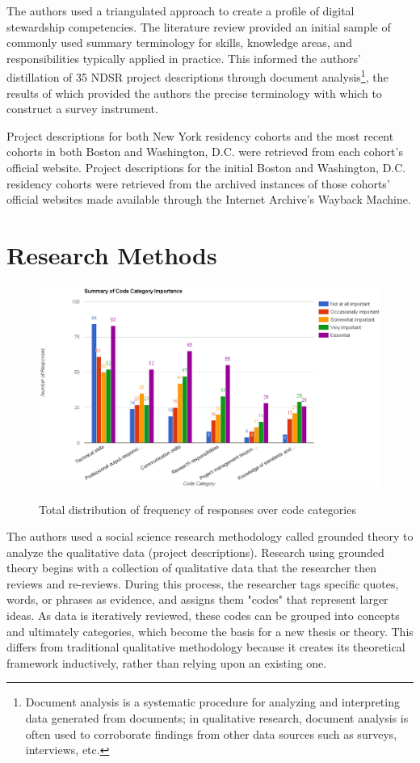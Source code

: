 \documentclass{acm_proc_article-sp}
\begin{document}
The authors used a triangulated approach to create a profile of digital stewardship competencies. The literature review provided an initial sample of commonly used summary terminology for skills, knowledge areas, and responsibilities typically applied in practice. This informed the authors' distillation of 35 NDSR project descriptions through document analysis\footnote{Document analysis is a systematic procedure for analyzing and interpreting data generated from documents; in qualitative research, document analysis is often used to corroborate findings from other data sources such as surveys, interviews, etc.\cite{22}}, the results of which provided the authors the precise terminology with which to construct a survey instrument. 

Project descriptions for both New York residency cohorts\cite{23} and the most recent cohorts in both Boston\cite{24} and Washington, D.C.\cite{25} were retrieved from each cohort's official website. Project descriptions for the initial Boston\cite{26} and Washington, D.C.\cite{27} residency cohorts were retrieved from the archived instances of those cohorts' official websites made available through the Internet Archive's Wayback Machine.  

\section{Research Methods}
\begin{figure}[!t]
  \includegraphics[scale=0.5]{total_skills.png} 
   \label{Figure 1.}   
    \caption{Total distribution of frequency of responses over code categories}
\end{figure}

The authors used a social science research methodology called grounded theory\cite{28} to analyze the qualitative data (project descriptions). Research using grounded theory begins with a collection of qualitative data that the researcher then reviews and re-reviews. During this process, the researcher tags specific quotes, words, or phrases as evidence, and assigns them "codes" that represent larger ideas.\cite{29} As data is iteratively reviewed, these codes can be grouped into concepts and ultimately categories, which become the basis for a new thesis or theory. This differs from traditional qualitative methodology because it creates its theoretical framework inductively, rather than relying upon an existing one.\cite{30}
\end{document}
